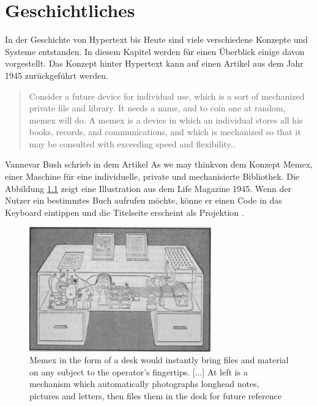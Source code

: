 \chapter{Geschichtliches}
\label{ch:Geschichtlich}

In der Geschichte von Hypertext bis Heute sind viele verschiedene Konzepte und Systeme entstanden. In diesem Kapitel werden für einen Überblick einige davon vorgestellt. Das Konzept hinter Hypertext kann auf einen Artikel aus dem Jahr 1945 zurückgeführt werden.

\begin{quote}
	\glqq Consider a future device for individual use, which is a sort of mechanized private file and library. It needs a name, and to coin one at random, memex will do. A memex is a device in which an individual stores all his books, records, and communications, and which is mechanized so that it may be consulted with exceeding speed and flexibility.\grqq{ }\cite[Section 6]{Bush1945}.
\end{quote}

Vannevar Bush schrieb in dem Artikel \glqq As we may think\grqq{ }von dem Konzept \glqq Memex\grqq{ }, einer Maschine für eine individuelle, private und mechanisierte Bibliothek. Die Abbildung \ref{fig:memex} zeigt eine Illustration aus dem Life Magazine 1945. Wenn der Nutzer ein bestimmtes Buch aufrufen möchte, könne er einen Code in das Keyboard eintippen und die Titelseite erscheint als Projektion \cite[S.121]{Life1945} \cite[Section 6]{Bush1945}. 

\begin{figure}[H]
	\centering
	\includegraphics[width=0.7\textwidth]{image/memex}
	\caption{\glqq Memex in the form of a desk would instantly bring files and material on any subject to the operator's fingertips. [...] At left is a mechanism which automatically photographs longhead notes, pictures and letters, then files them in the desk for future reference\grqq{ } \cite[S.123]{Life1945}}
	\label{fig:memex}
\end{figure}

